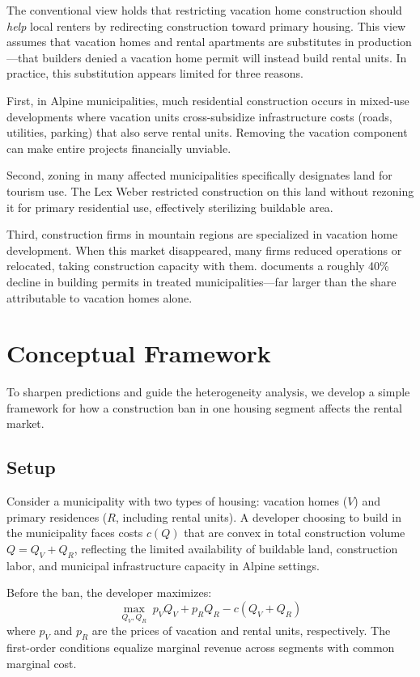 \documentclass[12pt]{article}
\begin{document}
The conventional view holds that restricting vacation home construction should \textit{help} local renters by redirecting construction toward primary housing. This view assumes that vacation homes and rental apartments are substitutes in production---that builders denied a vacation home permit will instead build rental units. In practice, this substitution appears limited for three reasons.

First, in Alpine municipalities, much residential construction occurs in mixed-use developments where vacation units cross-subsidize infrastructure costs (roads, utilities, parking) that also serve rental units. Removing the vacation component can make entire projects financially unviable.

Second, zoning in many affected municipalities specifically designates land for tourism use. The Lex Weber restricted construction on this land without rezoning it for primary residential use, effectively sterilizing buildable area.

Third, construction firms in mountain regions are specialized in vacation home development. When this market disappeared, many firms reduced operations or relocated, taking construction capacity with them. \citet{deville2022restricting} documents a roughly 40\% decline in building permits in treated municipalities---far larger than the share attributable to vacation homes alone.


\section{Conceptual Framework}
\label{sec:framework}

To sharpen predictions and guide the heterogeneity analysis, we develop a simple framework for how a construction ban in one housing segment affects the rental market.

\subsection{Setup}

Consider a municipality with two types of housing: vacation homes ($V$) and primary residences ($R$, including rental units). A developer choosing to build in the municipality faces costs $c(Q)$ that are convex in total construction volume $Q = Q_V + Q_R$, reflecting the limited availability of buildable land, construction labor, and municipal infrastructure capacity in Alpine settings.

Before the ban, the developer maximizes:
\begin{equation}
\max_{Q_V, Q_R} \; p_V Q_V + p_R Q_R - c(Q_V + Q_R)
\end{equation}
where $p_V$ and $p_R$ are the prices of vacation and rental units, respectively. The first-order conditions equalize marginal revenue across segments with common marginal cost.
\end{document}
